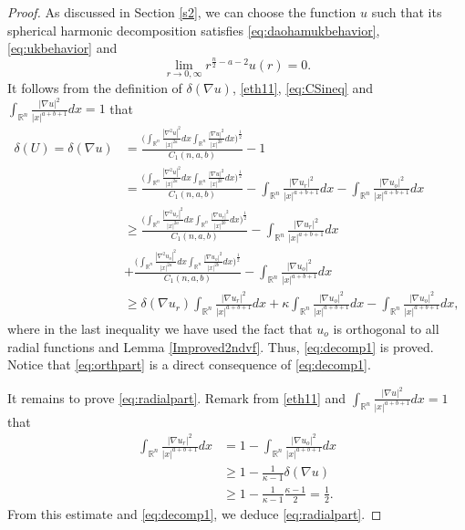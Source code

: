\documentclass[a4paper,12pt]{article}
\theoremstyle{plain}
\theoremstyle{definition}
\theoremstyle{remark}
\def\R{\mathbb R}%
\def\irn{\int_{\R^n}}
\numberwithin{equation}{section}
\begin{document}
\begin{proof}
As discussed in Section \ref{s2}, we can choose the function $u$ such that its spherical harmonic decomposition satisfies \eqref{eq:daohamukbehavior}, \eqref{eq:ukbehavior} and
\[
\lim_{r\to 0, \infty} r^{\frac n2 -a -2}u(r) =0.
\]
It follows from the definition of $\delta(\nabla u)$, \eqref{eth11},  \eqref{eq:CSineq}  and $\irn \frac{|\nabla u|^2}{|x|^{a+b+1}} dx =1$ that 
\begin{align*}
	\delta(U) =\delta(\nabla u)&=\frac{\Big(\irn \frac{|\nabla^2 u|^2}{|x|^{2a}} dx \irn \frac{|\nabla u|^2}{|x|^{2b}} dx\Big)^{\frac12}}{C_1(n,a,b)} -1\\
	&=\frac{\Big(\irn \frac{|\nabla^2 u|^2}{|x|^{2a}} dx \irn \frac{|\nabla u|^2}{|x|^{2b}} dx\Big)^{\frac12}}{C_1(n,a,b)} -\irn \frac{|\nabla u_r|^2}{|x|^{a+b+1}} dx - \irn \frac{|\nabla u_o|^2}{|x|^{a+b+1}} dx\\
	&\geq \frac{\Big(\irn \frac{|\nabla^2 u_r|^2}{|x|^{2a}} dx \irn \frac{|\nabla u_r|^2}{|x|^{2b}} dx\Big)^{\frac12}}{C_1(n,a,b)} -\irn \frac{|\nabla u_r|^2}{|x|^{a+b+1}} dx \\
	&+ \frac{\Big(\irn \frac{|\nabla^2 u_o|^2}{|x|^{2a}} dx \irn \frac{|\nabla u_o|^2}{|x|^{2b}} dx\Big)^{\frac12}}{C_1(n,a,b)} - \irn \frac{|\nabla u_o|^2}{|x|^{a+b+1}} dx\\
		&\geq { \delta(\nabla u_r)}\irn \frac{|\nabla u_r|^2}{|x|^{a+b+1}} dx 
	+ \kappa \irn \frac{|\nabla u_o|^2}{|x|^{a+b+1}} dx- \irn \frac{|\nabla u_o|^2}{|x|^{a+b+1}} dx,
\end{align*}
where in the last inequality we have used the fact that $u_o$ is orthogonal to all radial functions and Lemma \ref{Improved2ndvf}.  Thus, \eqref{eq:decomp1} is proved. Notice that \eqref{eq:orthpart} is a direct consequence of \eqref{eq:decomp1}.

It remains to prove \eqref{eq:radialpart}.  Remark from \eqref{eth11} and $\irn \frac{|\nabla u|^2}{|x|^{a+b+1}} dx =1$ that 
\begin{align*}
	\irn \frac{|\nabla u_r|^2}{|x|^{a+b+1}} dx& =1- \irn \frac{|\nabla u_o|^2}{|x|^{a+b+1}} dx\\
	&\geq 1-\frac{1}{\kappa-1}{ \delta(\nabla u)}\\
	&\geq 1-\frac{1}{\kappa-1}\frac{\kappa-1}{2}=\frac 12.
\end{align*}
From this estimate and \eqref{eq:decomp1}, we deduce \eqref{eq:radialpart}.
\end{proof}
\end{document}
